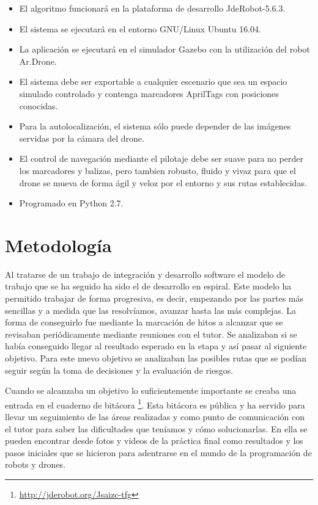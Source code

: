 \begin{itemize}
		\item El algoritmo funcionará en la plataforma de desarrollo JdeRobot-5.6.3.
		\item El sistema se ejecutará en el entorno GNU/Linux Ubuntu 16.04.
		\item La aplicación se ejecutará en el simulador Gazebo con la utilización del robot Ar.Drone.
		\item El sistema debe ser exportable a cualquier escenario que sea un espacio simulado controlado y contenga marcadores AprilTags con posiciones conocidas.
		\item Para la autolocalización, el sistema sólo puede depender de las imágenes servidas por la cámara del drone.
		\item El control de navegación mediante el pilotaje debe ser suave para no perder los marcadores y balizas, pero tambien robusto, fluido y vivaz para que el drone se mueva de forma ágil y veloz por el entorno y sus rutas establecidas.
		\item Programado en Python 2.7.
\end{itemize}


\section{Metodología}
\hspace{1cm} Al tratarse de un trabajo de integración y desarrollo software el modelo de trabajo que se ha seguido ha sido el de desarrollo en espiral. Este modelo ha permitido trabajar de forma progresiva, es decir, empezando por las partes más sencillas y a medida que las resolvíamos, avanzar hasta las más complejas. La forma de conseguirlo fue mediante la marcación de hitos a alcanzar que se revisaban periódicamente mediante reuniones con el tutor. Se analizaban si se había conseguido llegar al resultado esperado en la etapa y así pasar al siguiente objetivo. Para este nuevo objetivo se analizaban las posibles rutas que se podían seguir según la toma de decisiones y la evaluación de riesgos.

\hspace{1cm} Cuando se alcanzaba un objetivo lo suficientemente importante se creaba una entrada en el cuaderno de bitácora \footnote{\url{http://jderobot.org/Jsaizc-tfg}}. Esta bitácora es pública y ha servido para llevar un seguimiento de las áreas realizadas y como punto de comunicación con el tutor para saber las dificultades que teníamos y cómo solucionarlas. En ella se pueden encontrar desde fotos y videos de la práctica final como resultados y los pasos iniciales que se hicieron para adentrarse en el mundo de la programación de robots y drones.

